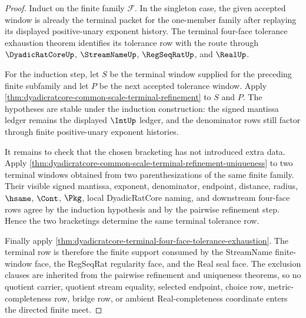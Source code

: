 \begin{proof}
Induct on the finite family $\mathcal{F}$. In the singleton case, the given accepted window is already the terminal packet for the one-member family after replaying its displayed positive-unary exponent history. The terminal four-face tolerance exhaustion theorem identifies its tolerance row with the route through $\DyadicRatCoreUp$, $\StreamNameUp$, $\RegSeqRatUp$, and $\RealUp$.

For the induction step, let $S$ be the terminal window supplied for the preceding finite subfamily and let $P$ be the next accepted tolerance window. Apply \autoref{thm:dyadicratcore-common-scale-terminal-refinement} to $S$ and $P$. The hypotheses are stable under the induction construction: the signed mantissa ledger remains the displayed $\IntUp$ ledger, and the denominator rows still factor through finite positive-unary exponent histories.

It remains to check that the chosen bracketing has not introduced extra data. Apply \autoref{thm:dyadicratcore-common-scale-terminal-refinement-uniqueness} to two terminal windows obtained from two parenthesizations of the same finite family. Their visible signed mantissa, exponent, denominator, endpoint, distance, radius, $\hsame$, $\Cont$, $\Pkg$, local DyadicRatCore naming, and downstream four-face rows agree by the induction hypothesis and by the pairwise refinement step. Hence the two bracketings determine the same terminal tolerance row.

Finally apply \autoref{thm:dyadicratcore-terminal-four-face-tolerance-exhaustion}. The terminal row is therefore the finite support consumed by the StreamName finite-window face, the RegSeqRat regularity face, and the Real seal face. The exclusion clauses are inherited from the pairwise refinement and uniqueness theorems, so no quotient carrier, quotient stream equality, selected endpoint, choice row, metric-completeness row, bridge row, or ambient Real-completeness coordinate enters the directed finite meet.
\end{proof}

